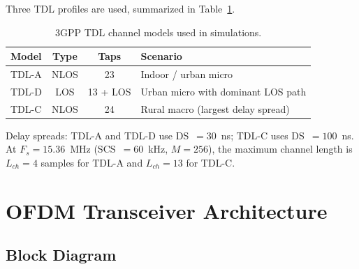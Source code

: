 \documentclass[11pt,a4paper,twoside]{article}
\begin{document}
Three TDL profiles are used, summarized in Table~\ref{tab:channels}.

\begin{table}[h]
\centering
\caption{3GPP TDL channel models used in simulations.}
\label{tab:channels}
\begin{tabular}{lccl}
\toprule
Model & Type & Taps & Scenario \\
\midrule
TDL-A & NLOS & 23 & Indoor / urban micro \\
TDL-D & LOS  & 13 + LOS & Urban micro with dominant LOS path \\
TDL-C & NLOS & 24 & Rural macro (largest delay spread) \\
\bottomrule
\end{tabular}
\end{table}

Delay spreads: TDL-A and TDL-D use DS~$= 30$~ns; TDL-C uses DS~$= 100$~ns. At $F_s = 15.36$~MHz (SCS~$= 60$~kHz, $M = 256$), the maximum channel length is $L_{ch} = 4$ samples for TDL-A and $L_{ch} = 13$ for TDL-C.

\section{OFDM Transceiver Architecture}
\label{sec:ofdm}

\subsection{Block Diagram}
\end{document}
